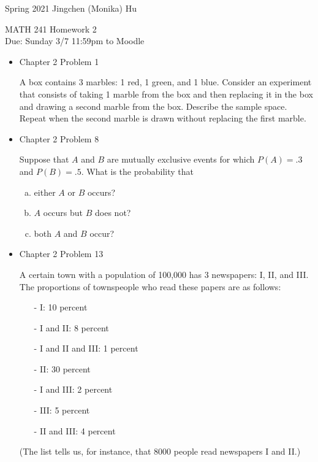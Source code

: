 \documentclass[11pt]{article}
\begin{document}
\enlargethispage{\baselineskip}

Spring 2021 \hfill Jingchen (Monika) Hu\\

\begin{center}
{\huge MATH 241 Homework 2}	\\
Due: Sunday 3/7 11:59pm to Moodle
\end{center}
\vspace{0.5cm}


\begin{itemize}


    \item
    Chapter 2 Problem 1
    
    A box contains 3 marbles: 1 red, 1 green, and 1 blue. Consider an experiment that consists of taking 1 marble from the box and then replacing it in the box and drawing a second marble from the box. Describe the sample space. Repeat when the second marble is drawn without replacing the first marble. 
    
    \item
    Chapter 2 Problem 8
    
    Suppose that $A$ and $B$ are mutually exclusive events for which $P(A) = .3$ and $P(B) = .5$. What is the probability that
    
    \begin{enumerate}[(a)]
    \item either $A$ or $B$ occurs?
    \item $A$ occurs but $B$ does not?
    \item both $A$ and $B$ occur?
    \end{enumerate}

    \item
    Chapter 2 Problem  13
    
    A certain town with a population of 100,000 has 3 newspapers: I, II, and III. The proportions of townspeople who read these papers are as follows:
    
    \begin{itemize}
    \item[-] I: 10 percent
    \item[-] I and II: 8 percent
    \item[-] I and II and III: 1 percent
    \item[-] II: 30 percent
    \item[-] I and III: 2 percent
    \item[-] III: 5 percent
    \item[-] II and III: 4 percent
    \end{itemize}
    (The list tells us, for instance, that 8000 people read newspapers I and II.)
    

\end{itemize}
\end{document}
